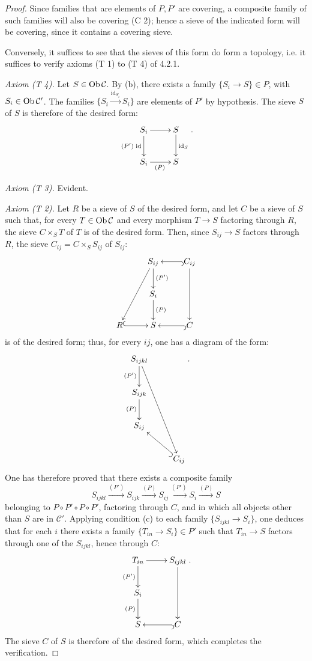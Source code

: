 \begin{proof}
Since families that are elements of \(P,P'\)
are covering, a composite family of such
families will also be covering (C 2);
hence a sieve of the indicated form will
be covering, since it contains a covering sieve.

Conversely, it suffices to see that the sieves
of this form do form a topology, i.e. it
suffices to verify axioms (T 1) to (T 4) of 4.2.1.

\emph{Axiom (T 4).} Let \(S\in\operatorname{Ob}\mathcal C\).
By (b), there exists a family \(\{S_i\to S\}\in P\),
with \(S_i\in\operatorname{Ob}\mathcal C'\).
The families \(\{S_i\xrightarrow{\mathrm{id}_{S_i}}S_i\}\)
are elements of \(P'\) by hypothesis.
The sieve \(S\) of \(S\) is therefore of the desired form:
\[
\xymatrix{S_i\ar[r]\ar[d]_{(P')\;\mathrm{id}} & S\ar[d]^{\mathrm{id}_S}\\
S_i\ar[r]_{(P)} & S }.
\]

\emph{Axiom (T 3).} Evident.

\emph{Axiom (T 2).} Let \(R\) be a sieve of
\(S\) of the desired form, and let \(C\) be
a sieve
of \(S\) such that, for every \(T\in\operatorname{Ob}\mathcal C\)
and every morphism \(T\to S\) factoring through
\(R\), the sieve \(C\times_S T\) of \(T\)
is of the desired form.
Then, since \(S_{ij}\to S\) factors through \(R\),
the sieve \(C_{ij}=C\times_S S_{ij}\) of \(S_{ij}\):
\[
\xymatrix{
 & S_{ij}\ar[d]^{(P')}\ar[ddl] & C_{ij}\ar@{^{(}->}[l]\ar[dd]\\
 & S_i\ar[d]^{(P)} & \\
R\ar@{^{(}->}[r] & S & C\ar@{^{(}->}[l] }
\]
is of the desired form; thus, for every \(ij\),
one has a diagram of the form:
\[
\xymatrix{
S_{ijkl}\ar[d]_{(P')}\ar[dddr]\\
S_{ijk}\ar[d]_{(P)}\\
S_{ij} & \\
 & C_{ij}\ar@{^{(}->}[ul] }.
\]
One has therefore proved that there exists
a composite family
\[
S_{ijkl}\xrightarrow{(P')}S_{ijk}
\xrightarrow{(P)}S_{ij}\xrightarrow{(P')}S_i
\xrightarrow{(P)}S
\]
belonging to \(P\circ P'\circ P\circ P'\),
factoring through \(C\), and in which all
objects other than \(S\) are in \(\mathcal C'\).
Applying condition (c) to each family
\(\{S_{ijkl}\to S_i\}\), one deduces that
for each \(i\) there exists a family
\(\{T_{in}\to S_i\}\in P'\) such that
\(T_{in}\to S\) factors through one of the
\(S_{ijkl}\), hence through \(C\):
\[
\xymatrix{
T_{in}\ar[r]\ar[d]_{(P')} & S_{ijkl}\ar[dd]\\
S_i\ar[d]_{(P)} & \\
S & C\ar@{^{(}->}[l] }.
\]
The sieve \(C\) of \(S\) is therefore of the
desired form, which completes the verification.


\end{proof}
